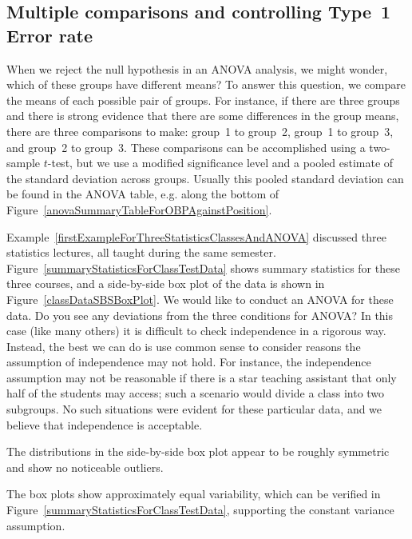 \D{\newpage}

\subsection{Multiple comparisons and controlling Type~1 Error rate}
\label{multipleComparisonsAndControllingTheType1ErrorRate}


When we reject the null hypothesis in an ANOVA analysis,
we might wonder, which of these groups have different means?
To answer this question, we compare the means of each possible
pair of groups.
For instance, if there are three groups and there is strong
evidence that there are some differences in the group means,
there are three comparisons to make:
group~1 to group~2, group~1 to group~3, and group~2 to group~3.
These comparisons can be accomplished using
a two-sample $t$-test, but we use a modified significance level
and a pooled estimate of the standard deviation across groups.
Usually this pooled standard deviation can be found in the
ANOVA table, e.g. along the bottom of
Figure~\ref{anovaSummaryTableForOBPAgainstPosition}.

\begin{examplewrap}
\begin{nexample}{
    Example~\vref{firstExampleForThreeStatisticsClassesAndANOVA}
    discussed three statistics lectures, all taught during the
    same semester.
    Figure~\ref{summaryStatisticsForClassTestData}
    shows summary statistics for these three courses,
    and a side-by-side box plot of the data is shown
    in Figure~\ref{classDataSBSBoxPlot}.
    We would like to conduct an ANOVA for these data.
    Do you see any deviations from the three conditions
    for ANOVA?}
  In this case (like many others) it is difficult to check
  independence in a rigorous way.
  Instead, the best we can do is use common sense to consider
  reasons the assumption of independence may not hold.
  For instance, the independence assumption may not be
  reasonable if there is a star teaching assistant that only
  half of the students may access;
  such a scenario would divide a class into two subgroups.
  No such situations were evident for these particular data,
  and we believe that independence is acceptable.

  The distributions in the side-by-side box plot appear
  to be roughly symmetric and show no noticeable outliers.

  The box plots show approximately equal variability,
  which can be verified in
  Figure~\ref{summaryStatisticsForClassTestData},
  supporting the constant variance assumption.
\end{nexample}
\end{examplewrap}

